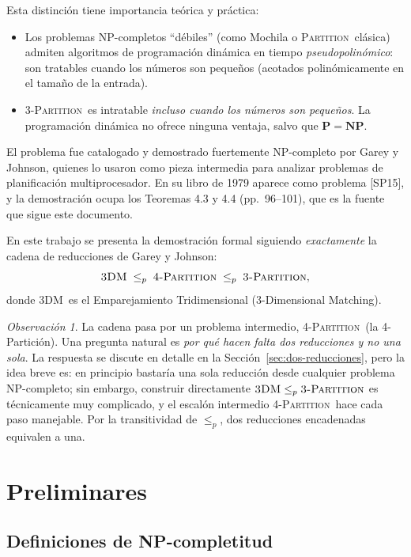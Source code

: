 \documentclass[12pt,a4paper]{article}
\theoremstyle{definition}
\theoremstyle{remark}
\newtheorem{remark}{Observación}
\newcommand{\TPART}{\textsc{3-Partition}}
\newcommand{\FPART}{\textsc{4-Partition}}
\newcommand{\DM}{\textsc{3DM}}
\newcommand{\PART}{\textsc{Partition}}
\begin{document}
Esta distinción tiene importancia teórica y práctica:
\begin{itemize}
  \item Los problemas NP-completos ``débiles'' (como Mochila o
        \PART\ clásica) admiten algoritmos de programación dinámica
        en tiempo \emph{pseudopolinómico}: son tratables cuando
        los números son pequeños (acotados polinómicamente en el tamaño de la
        entrada).
  \item \TPART\ es intratable \emph{incluso cuando los números son pequeños}.
        La programación dinámica no ofrece ninguna ventaja, salvo que
        $\mathbf{P}=\mathbf{NP}$.
\end{itemize}

El problema fue catalogado y demostrado fuertemente NP-completo por
Garey y Johnson, quienes lo usaron como pieza intermedia para analizar
problemas de planificación multiprocesador. En su libro de 1979 aparece como
problema [SP15], y la demostración ocupa los Teoremas 4.3 y 4.4
(pp.~96--101), que es la fuente que sigue este documento.

En este trabajo se presenta la demostración formal siguiendo \emph{exactamente}
la cadena de reducciones de Garey y Johnson:
\[
  \DM \;\leq_p\; \FPART \;\leq_p\; \TPART,
\]
donde \DM\ es el Emparejamiento Tridimensional (3-Dimensional Matching).

\begin{remark}
La cadena pasa por un problema intermedio, \FPART\ (la 4-Partición). Una pregunta
natural es \emph{por qué hacen falta dos reducciones y no una sola}. La respuesta
se discute en detalle en la Sección~\ref{sec:dos-reducciones}, pero la idea breve
es: en principio bastaría una sola reducción desde cualquier problema NP-completo;
sin embargo, construir directamente $\DM \leq_p \TPART$ es técnicamente muy
complicado, y el escalón intermedio \FPART\ hace cada paso manejable. Por la
transitividad de $\leq_p$, dos reducciones encadenadas equivalen a una.
\end{remark}

\section{Preliminares}

\subsection{Definiciones de NP-completitud}
\end{document}
